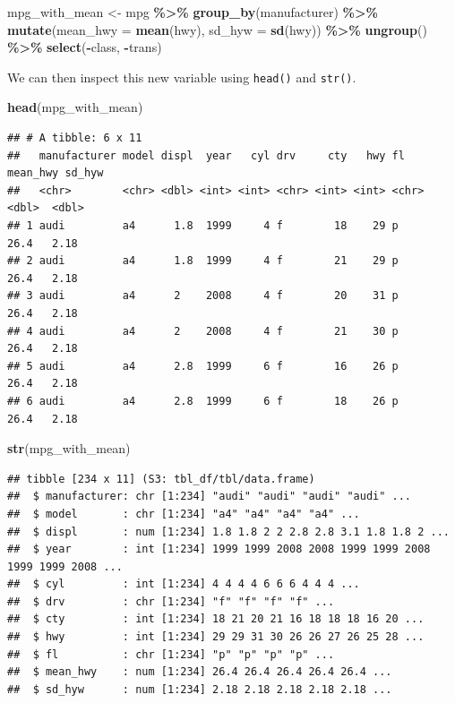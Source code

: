 \documentclass[
]{book}
\newenvironment{Shaded}{\begin{snugshade}}{\end{snugshade}}
\newcommand{\AttributeTok}[1]{\textcolor[rgb]{0.13,0.29,0.53}{#1}}
\newcommand{\FunctionTok}[1]{\textcolor[rgb]{0.13,0.29,0.53}{\textbf{#1}}}
\newcommand{\NormalTok}[1]{#1}
\newcommand{\OtherTok}[1]{\textcolor[rgb]{0.56,0.35,0.01}{#1}}
\newcommand{\SpecialCharTok}[1]{\textcolor[rgb]{0.81,0.36,0.00}{\textbf{#1}}}
\begin{document}
\begin{Shaded}
\begin{Highlighting}[]
\NormalTok{mpg\_with\_mean }\OtherTok{\textless{}{-}}\NormalTok{ mpg }\SpecialCharTok{\%\textgreater{}\%} 
  \FunctionTok{group\_by}\NormalTok{(manufacturer) }\SpecialCharTok{\%\textgreater{}\%}
    \FunctionTok{mutate}\NormalTok{(}\AttributeTok{mean\_hwy =} \FunctionTok{mean}\NormalTok{(hwy), }\AttributeTok{sd\_hyw =} \FunctionTok{sd}\NormalTok{(hwy)) }\SpecialCharTok{\%\textgreater{}\%}
  \FunctionTok{ungroup}\NormalTok{() }\SpecialCharTok{\%\textgreater{}\%}
  \FunctionTok{select}\NormalTok{(}\SpecialCharTok{{-}}\NormalTok{class, }\SpecialCharTok{{-}}\NormalTok{trans) }
\end{Highlighting}
\end{Shaded}

We can then inspect this new variable using \texttt{head()} and \texttt{str()}.

\begin{Shaded}
\begin{Highlighting}[]
\FunctionTok{head}\NormalTok{(mpg\_with\_mean)}
\end{Highlighting}
\end{Shaded}

\begin{verbatim}
## # A tibble: 6 x 11
##   manufacturer model displ  year   cyl drv     cty   hwy fl    mean_hwy sd_hyw
##   <chr>        <chr> <dbl> <int> <int> <chr> <int> <int> <chr>    <dbl>  <dbl>
## 1 audi         a4      1.8  1999     4 f        18    29 p         26.4   2.18
## 2 audi         a4      1.8  1999     4 f        21    29 p         26.4   2.18
## 3 audi         a4      2    2008     4 f        20    31 p         26.4   2.18
## 4 audi         a4      2    2008     4 f        21    30 p         26.4   2.18
## 5 audi         a4      2.8  1999     6 f        16    26 p         26.4   2.18
## 6 audi         a4      2.8  1999     6 f        18    26 p         26.4   2.18
\end{verbatim}

\begin{Shaded}
\begin{Highlighting}[]
\FunctionTok{str}\NormalTok{(mpg\_with\_mean)}
\end{Highlighting}
\end{Shaded}

\begin{verbatim}
## tibble [234 x 11] (S3: tbl_df/tbl/data.frame)
##  $ manufacturer: chr [1:234] "audi" "audi" "audi" "audi" ...
##  $ model       : chr [1:234] "a4" "a4" "a4" "a4" ...
##  $ displ       : num [1:234] 1.8 1.8 2 2 2.8 2.8 3.1 1.8 1.8 2 ...
##  $ year        : int [1:234] 1999 1999 2008 2008 1999 1999 2008 1999 1999 2008 ...
##  $ cyl         : int [1:234] 4 4 4 4 6 6 6 4 4 4 ...
##  $ drv         : chr [1:234] "f" "f" "f" "f" ...
##  $ cty         : int [1:234] 18 21 20 21 16 18 18 18 16 20 ...
##  $ hwy         : int [1:234] 29 29 31 30 26 26 27 26 25 28 ...
##  $ fl          : chr [1:234] "p" "p" "p" "p" ...
##  $ mean_hwy    : num [1:234] 26.4 26.4 26.4 26.4 26.4 ...
##  $ sd_hyw      : num [1:234] 2.18 2.18 2.18 2.18 2.18 ...
\end{verbatim}
\end{document}
